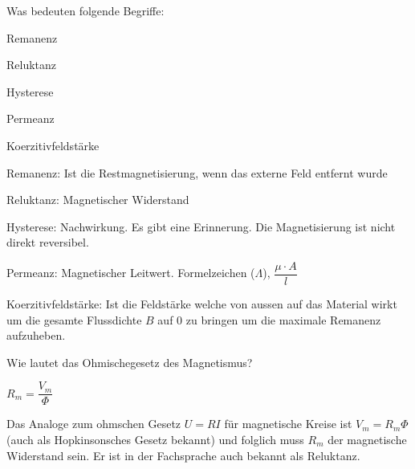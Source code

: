 \begin{karte}{Was bedeuten folgende Begriffe:\\
	\begin{compactitem}
		\item Remanenz
		\item Reluktanz
		\item Hysterese
		\item Permeanz
		\item Koerzitivfeldstärke
	\end{compactitem}}

	\begin{compactitem}
		\item Remanenz: Ist die Restmagnetisierung, wenn das externe Feld entfernt wurde
		\item Reluktanz: Magnetischer Widerstand
		\item Hysterese: Nachwirkung. Es gibt eine Erinnerung. Die Magnetisierung ist nicht direkt reversibel.
		\item Permeanz: Magnetischer Leitwert. Formelzeichen ($\Lambda$), $\dfrac{\mu \cdot A}{l}$
		\item Koerzitivfeldstärke: Ist die Feldstärke welche von aussen auf das Material wirkt um die gesamte Flussdichte $B$ auf $0$ zu bringen um die maximale Remanenz aufzuheben.
	\end{compactitem}
\end{karte}

\begin{karte}{Wie lautet das Ohmischegesetz des Magnetismus?}
	\begin{huge}
		\begin{center}
			$R_{m}=\dfrac{V_{m}}{\Phi}$\\
		\end{center}
	\end{huge}
	Das Analoge zum ohmschen Gesetz $U=R I$ für magnetische Kreise ist $V_{m}=R_{m} \Phi$ (auch als Hopkinsonsches Gesetz bekannt) und folglich muss $R_{m}$ der magnetische Widerstand sein. Er ist in der Fachsprache auch bekannt als Reluktanz.
\end{karte}